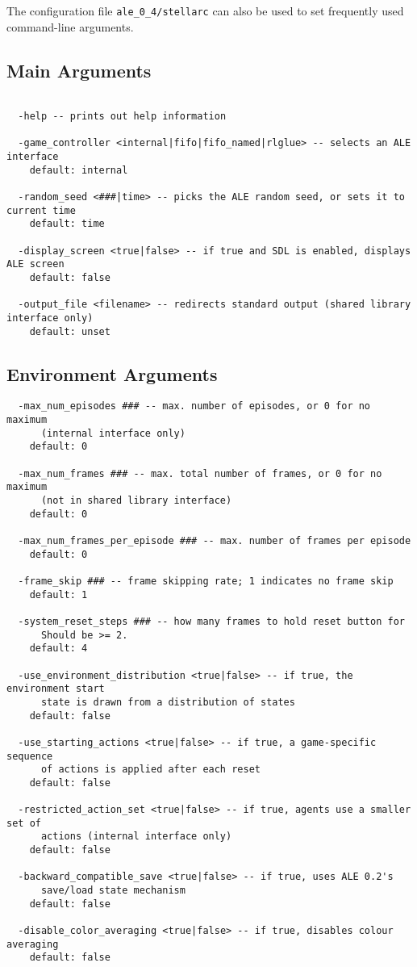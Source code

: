 \documentclass[12pt]{article}
\begin{document}
The configuration file \verb+ale_0_4/stellarc+ can also be used to set frequently used
command-line arguments. 

\subsection{Main Arguments}
\small{
\begin{verbatim}

  -help -- prints out help information

  -game_controller <internal|fifo|fifo_named|rlglue> -- selects an ALE interface
    default: internal

  -random_seed <###|time> -- picks the ALE random seed, or sets it to current time
    default: time

  -display_screen <true|false> -- if true and SDL is enabled, displays ALE screen
    default: false

  -output_file <filename> -- redirects standard output (shared library interface only)
    default: unset
\end{verbatim}
}

\subsection{Environment Arguments}

\small{
\begin{verbatim}
  -max_num_episodes ### -- max. number of episodes, or 0 for no maximum 
      (internal interface only)
    default: 0

  -max_num_frames ### -- max. total number of frames, or 0 for no maximum 
      (not in shared library interface)
    default: 0

  -max_num_frames_per_episode ### -- max. number of frames per episode
    default: 0

  -frame_skip ### -- frame skipping rate; 1 indicates no frame skip 
    default: 1

  -system_reset_steps ### -- how many frames to hold reset button for 
      Should be >= 2.
    default: 4

  -use_environment_distribution <true|false> -- if true, the environment start 
      state is drawn from a distribution of states
    default: false

  -use_starting_actions <true|false> -- if true, a game-specific sequence
      of actions is applied after each reset
    default: false

  -restricted_action_set <true|false> -- if true, agents use a smaller set of 
      actions (internal interface only)
    default: false

  -backward_compatible_save <true|false> -- if true, uses ALE 0.2's 
      save/load state mechanism
    default: false

  -disable_color_averaging <true|false> -- if true, disables colour averaging 
    default: false
\end{verbatim}
}
\end{document}
